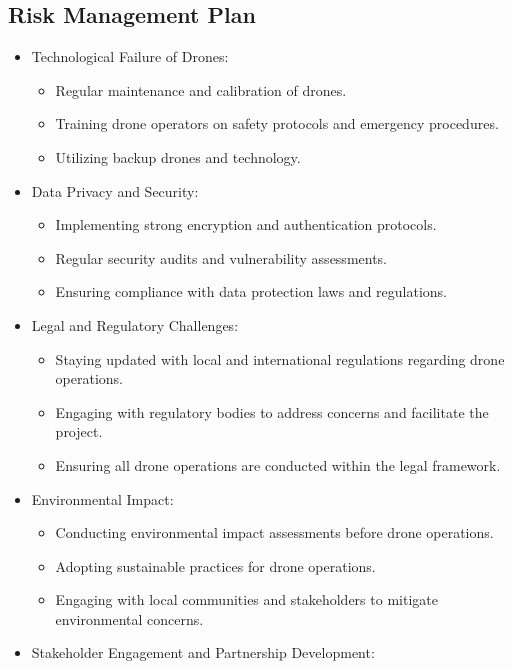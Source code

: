 \documentclass{article}
\begin{document}
\subsection*{Risk Management Plan}
\begin{itemize}[label={--}]

    \item Technological Failure of Drones:
    \begin{itemize}
        \item Regular maintenance and calibration of drones.
        \item Training drone operators on safety protocols and emergency procedures.
        \item Utilizing backup drones and technology.
    \end{itemize}
    \item Data Privacy and Security:
    \begin{itemize}
        \item Implementing strong encryption and authentication protocols.
        \item Regular security audits and vulnerability assessments.
        \item Ensuring compliance with data protection laws and regulations.
    \end{itemize}
    \item Legal and Regulatory Challenges:
    \begin{itemize}
        \item Staying updated with local and international regulations regarding drone operations.
        \item Engaging with regulatory bodies to address concerns and facilitate the project.
        \item Ensuring all drone operations are conducted within the legal framework.
    \end{itemize}
    \item Environmental Impact:
    \begin{itemize}
        \item Conducting environmental impact assessments before drone operations.
        \item Adopting sustainable practices for drone operations.
        \item Engaging with local communities and stakeholders to mitigate environmental concerns.
    \end{itemize}
    \item Stakeholder Engagement and Partnership Development:

\end{itemize}
\end{document}
